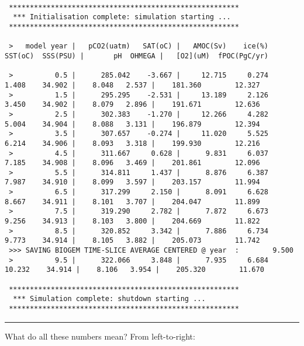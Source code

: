 \vspace{-2mm}\tiny\begin{verbatim}

 *******************************************************
  *** Initialisation complete: simulation starting ...
 *******************************************************

 >   model year |   pCO2(uatm)   SAT(oC) |   AMOC(Sv)    ice(%)   SST(oC)  SSS(PSU) |       pH  OHMEGA |   [O2](uM)  fPOC(PgC/yr)

 >          0.5 |      285.042    -3.667 |     12.715     0.274     1.408    34.902 |    8.048   2.537 |    181.360        12.327
 >          1.5 |      295.295    -2.531 |     13.189     2.126     3.450    34.902 |    8.079   2.896 |    191.671        12.636
 >          2.5 |      302.383    -1.270 |     12.266     4.282     5.004    34.904 |    8.088   3.131 |    196.879        12.394
 >          3.5 |      307.657    -0.274 |     11.020     5.525     6.214    34.906 |    8.093   3.318 |    199.930        12.216
 >          4.5 |      311.667     0.628 |      9.831     6.037     7.185    34.908 |    8.096   3.469 |    201.861        12.096
 >          5.5 |      314.811     1.437 |      8.876     6.387     7.987    34.910 |    8.099   3.597 |    203.157        11.994
 >          6.5 |      317.299     2.150 |      8.091     6.628     8.667    34.911 |    8.101   3.707 |    204.047        11.899
 >          7.5 |      319.290     2.782 |      7.872     6.673     9.256    34.913 |    8.103   3.800 |    204.669        11.822
 >          8.5 |      320.852     3.342 |      7.886     6.734     9.773    34.914 |    8.105   3.882 |    205.073        11.742
 >>> SAVING BIOGEM TIME-SLICE AVERAGE CENTERED @ year  :        9.500
 >          9.5 |      322.066     3.848 |      7.935     6.684    10.232    34.914 |    8.106   3.954 |    205.320        11.670

 *******************************************************
  *** Simulation complete: shutdown starting ...
 *******************************************************

\end{verbatim}\normalsize\vspace{-2mm}

\vspace{1mm}\noindent\rule{4cm}{0.5pt}\vspace{2mm}

\noindent What do all these numbers mean? From left-to-right:

